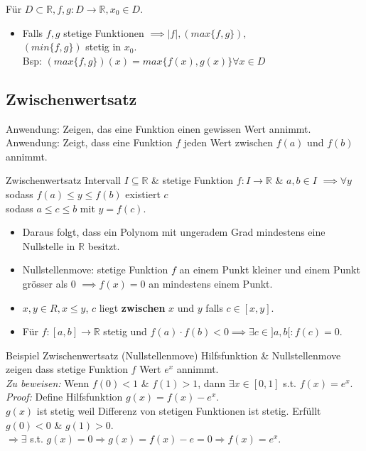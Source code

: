 \documentclass[a4paper]{article}
\newcommand\R{\ensuremath{\mathbb{R}}}
\begin{document}
Für $D \subset \R, f, g: D \to \R, x_0 \in D$. 
\begin{itemize}[leftmargin=4.5mm, topsep=1pt, parsep=1pt] 
  \item Falls $f, g$ stetige Funktionen $\implies |f|, (max\{f,g\}),$ \\
            $(min\{f,g\})$ stetig in $x_0$. \\
              \tiny \color{gray}
            Bsp: $(max\{f,g\})(x) = max\{f(x), g(x)\} \forall x \in D$
            \normalsize \color{black}
\end{itemize}

\subsection{Zwischenwertsatz}
\tiny \color{gray}
  Anwendung: Zeigen, das eine Funktion einen gewissen Wert annimmt. \\
  Anwendung: Zeigt, dass eine Funktion $f$ jeden Wert zwischen $f(a)$ und $f(b)$ annimmt. \\
\normalsize \color{black}
\begin{mainbox}{Zwischenwertsatz}
  Intervall $I \subseteq \R$ \& stetige Funktion $f: I \to \R$ \& $a, b \in I$ $\implies \forall y$ sodass $f(a) \leqslant y \leqslant f(b)$ existiert $c$ \\
  \qquad sodass $a \le c \le b$ mit $y = f(c)$. \\
\end{mainbox}
\begin{itemize}[leftmargin=4.5mm, topsep=1pt, parsep=1pt] 
  \item Daraus folgt, dass ein Polynom mit ungeradem Grad mindestens eine Nullstelle in $\R$ besitzt.
  \item Nullstellenmove: stetige Funktion $f$ an einem Punkt kleiner und einem Punkt grösser als 0 $\implies f(x) = 0$ an mindestens einem Punkt.
  \item $x, y \in R, x \le y$, $c$ liegt \textbf{zwischen} $x$ und $y$ falls $c \in [x, y]$.
  \item Für $f: [a,b] \to \R$ stetig und $f(a) \cdot f(b) < 0 \implies \exists c \in ]a,b[: f(c) = 0$.
\end{itemize}

\begin{bspbox}{Beispiel Zwischenwertsatz (Nullstellenmove)}
  \tiny \color{gray}
    Hilfsfunktion \& Nullstellenmove zeigen dass stetige Funktion $f$ Wert $e^x$ annimmt. \\
  \normalsize \color{black}
  \textit{Zu beweisen:} Wenn $f(0) < 1$ \& $f(1) > 1$, dann $\exists x \in [0,1]$ s.t. $f(x) = e^x$. \\
  \textit{Proof:} Define Hilfsfunktion $g(x) = f(x) - e^x$. \\
  $g(x)$ ist stetig weil Differenz von stetigen Funktionen ist stetig. Erfüllt $g(0) < 0$ \& $g(1) > 0$. \\
  $\Rightarrow \exists$ s.t. $g(x) = 0 \Rightarrow g(x) = f(x) - e = 0 \Rightarrow f(x) = e^x$. \\
\end{bspbox}
\end{document}
